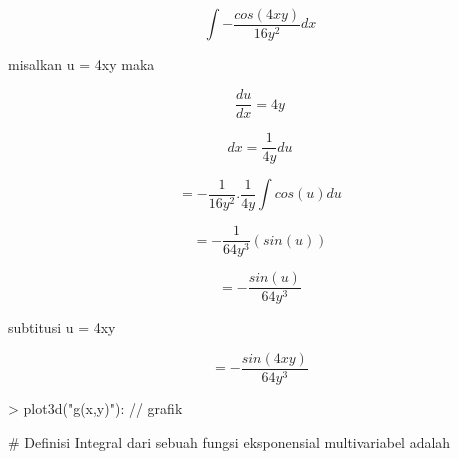 \documentclass[a4paper,10pt]{article}
\begin{document}
\begin{eulernotebook}
\begin{eulercomment}
\begin{eulercomment}
\begin{eulercomment}
\begin{eulercomment}
\begin{eulercomment}
\begin{eulercomment}
\begin{eulercomment}
\begin{eulercomment}
\begin{eulercomment}
\begin{eulercomment}
\begin{eulercomment}
\begin{eulercomment}
\begin{eulercomment}
\begin{eulercomment}
\begin{eulerformula}
\[
\int - \frac {cos(4xy)} {16y^2} dx
\]
\end{eulerformula}
\begin{eulercomment}
\end{eulercomment}
\begin{eulerttcomment}
 misalkan u = 4xy maka
\end{eulerttcomment}
\begin{eulerformula}
\[
\frac {du} {dx} = 4y
\]
\end{eulerformula}
\begin{eulerformula}
\[
dx = \frac {1} {4y} du
\]
\end{eulerformula}
\begin{eulercomment}
\end{eulercomment}
\begin{eulerformula}
\[
= - \frac {1} {16y^2} . \frac {1} {4y} \int cos(u) du
\]
\end{eulerformula}
\begin{eulercomment}
\end{eulercomment}
\begin{eulerformula}
\[
= - \frac {1} {64y^3} (sin(u))
\]
\end{eulerformula}
\begin{eulercomment}
\end{eulercomment}
\begin{eulerformula}
\[
= - \frac {sin(u)} {64y^3}
\]
\end{eulerformula}
\begin{eulercomment}
\end{eulercomment}
\begin{eulerttcomment}
 subtitusi u = 4xy
\end{eulerttcomment}
\begin{eulerformula}
\[
= - \frac {sin(4xy)} {64y^3}
\]
\end{eulerformula}
\begin{eulerprompt}
> plot3d("g(x,y)"): // grafik
\end{eulerprompt}
\begin{eulercomment}
\end{eulercomment}
\begin{eulercomment}
\end{eulercomment}
\begin{eulerttcomment}
 # Definisi
   Integral dari sebuah fungsi eksponensial multivariabel adalah

\end{eulerttcomment}
\end{eulercomment}
\end{eulercomment}
\end{eulercomment}
\end{eulercomment}
\end{eulercomment}
\end{eulercomment}
\end{eulercomment}
\end{eulercomment}
\end{eulercomment}
\end{eulercomment}
\end{eulercomment}
\end{eulercomment}
\end{eulercomment}
\end{eulercomment}
\end{eulernotebook}
\end{document}
